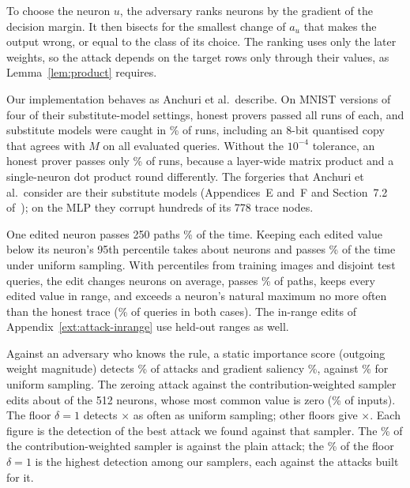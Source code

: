  To choose the neuron $u$, the adversary ranks neurons by the gradient of
the decision margin. It then bisects for the smallest change of $a_u$ that makes the output wrong,
or equal to the class of its choice. The ranking uses only the later weights, so the attack depends
on the target rows only through their values, as Lemma~\ref{lem:product} requires.

 Our implementation behaves as Anchuri et al.\ describe. On MNIST versions of
four of their substitute-model settings, honest provers passed all \ReproRuns{} runs of each, and
substitute models were caught in \ReproCaught{}\% of runs, including an 8-bit quantised copy that agrees
with $M$ on all \ReproQueries{} evaluated queries. Without the $10^{-4}$ tolerance, an honest prover passes only
\ReproZeroTolerance{}\% of runs, because a layer-wide matrix product and a single-neuron dot product round
differently. The forgeries that Anchuri et al.\ consider are their substitute models (Appendices~E
and~F and Section~7.2 of~\cite{anchuri2026verifiable}); on the MLP they corrupt hundreds of its 778
trace nodes.

 One edited neuron passes 250 paths \SokPathMany{}\% of the time. Keeping each
edited value below its neuron's 95th percentile takes about \MnistStealthNeurons{} neurons and passes \MnistStealthPass{}\% of the
time under uniform sampling. With percentiles from \StealthCalib{} training images and \LocatorQueries{} disjoint test
queries, the edit changes \StealthNeurons{} neurons on average, passes \StealthPass{}\% of paths, keeps every edited value in
range, and exceeds a neuron's natural maximum no more often than the honest trace (\StealthExceed{}\% of queries in
both cases). The in-range edits of Appendix~\ref{ext:attack-inrange} use held-out ranges as well.

 Against an adversary who knows the rule, a static importance score
(outgoing weight magnitude) detects \SamplerStatic{}\% of attacks and gradient saliency \SamplerSaliency{}\%, against \SamplerUniform{}\%
for uniform sampling. The zeroing attack against the contribution-weighted sampler edits about \ZeroingNeurons{}
of the 512 neurons, whose most common value is zero (\ZeroingZeroShare{}\% of inputs). The floor $\delta=1$ detects
\FloorVsUniform{}$\times$ as often as uniform sampling; other floors give \FloorOthers{}$\times$. Each figure is the
detection of the best attack we found against that sampler. The \SamplerContribution{}\% of the contribution-weighted
sampler is against the plain attack; the \FloorBest{}\% of the floor $\delta=1$ is the highest detection among our
samplers, each against the attacks built for it.

